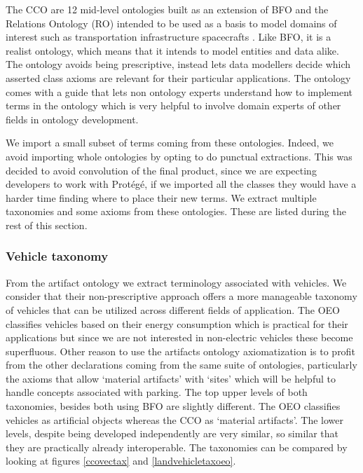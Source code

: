 The CCO are 12 mid-level ontologies built as an extension of BFO and the
Relations Ontology (RO) intended to be used as a basis to model domains of
interest such as transportation infrastructure spacecrafts
\cite{Rudnicki.23September2020}. Like BFO, it is a realist ontology, which
means that it intends to model entities and data alike. The ontology avoids
being prescriptive, instead lets data modellers decide which asserted class
axioms are relevant for their particular applications. The ontology comes with
a guide that lets non ontology experts understand how to implement terms in the
ontology which is very helpful to involve domain experts of other fields in
ontology development.

We import a small subset of terms coming from these ontologies. Indeed, we
avoid importing whole ontologies by opting to do punctual extractions. This was
decided to avoid convolution of the final product, since we are expecting
developers to work with Protégé, if we imported all the classes they would have
a harder time finding where to place their new terms. We extract multiple
taxonomies and some axioms from these ontologies. These are listed during the
rest of this section.

\subsubsection{Vehicle taxonomy}

From the artifact ontology we extract terminology associated with vehicles. We
consider that their non-prescriptive approach offers a more manageable taxonomy
of vehicles that can be utilized across different fields of application. The
OEO classifies vehicles based on their energy consumption which is practical
for their applications but since we are not interested in non-electric vehicles
these become superfluous. Other reason to use the artifacts ontology
axiomatization is to profit from the other declarations coming from the same
suite of ontologies, particularly the axioms that allow `material artifacts'
with `sites' which will be helpful to handle concepts associated with parking.
The top upper levels of both taxonomies, besides both using BFO are slightly
different. The OEO classifies vehicles as artificial objects whereas the CCO as
`material artifacts'. The lower levels, despite being developed independently
are very similar, so similar  that they are practically already interoperable.
The taxonomies can be compared by looking at figures \ref{ccovectax} and
\ref{landvehicletaxoeo}.

